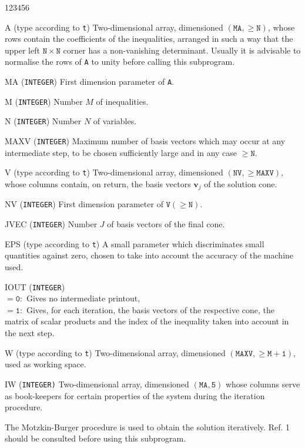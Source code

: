 \begin{DLtt}{123456}
\item [A] (type according to {\tt t}) Two-dimensional array, dimensioned
$\mathtt{ (MA,\ge N)}$, whose rows contain the  coefficients of the
inequalities, arranged in such a way that the upper left
$\mathtt{N \times N}$ corner has a non-vanishing determinant.
Usually it is advisable to normalise the rows of {\tt A} to unity
before calling this subprogram.
\item [MA] ({\tt INTEGER}) First dimension parameter of {\tt A}.
\item [M] ({\tt INTEGER}) Number $M$ of inequalities.
\item [N] ({\tt INTEGER}) Number $N$ of variables.
\item [MAXV] ({\tt INTEGER}) Maximum number of basis vectors
which may occur at any intermediate step, to be chosen
sufficiently large and in any case $\mathtt{\ge N}$.
\item [V] (type according to {\tt t}) Two-dimensional array, dimensioned
$\mathtt{(NV,\ge MAXV)}$,  whose columns contain, on
return, the basis vectors $\mathbf{v}_j$ of the solution cone.
\item[NV] ({\tt INTEGER}) First dimension parameter of
$\mathtt{V (\ge N)}$.
\item [JVEC] ({\tt INTEGER}) Number $J$ of basis vectors of the final
cone.
\item [EPS] (type according to {\tt t}) A small parameter which
discriminates small quantities against zero, chosen to take into
account the accuracy of the machine used.
\item [IOUT] ({\tt INTEGER}) \\
$\mathtt{= 0:}$ Gives no intermediate printout, \\
$\mathtt{= 1:}$ Gives, for each iteration, the basis vectors of the
respective cone, the matrix of scalar products and the index of the
inequality taken into account in the next step.
\item [W] (type according to {\tt t}) Two-dimensional array, dimensioned
$(\mathtt{MAXV,\ge M+1})$, used as working space.
\item [IW]({\tt INTEGER)} Two-dimensional array, dimensioned
$\mathtt{(MA,5)}$ whose columns serve as book-keepers
for certain properties of the system during the iteration procedure.
\end{DLtt}
\Method
The Motzkin-Burger procedure is used to obtain the solution iteratively.
Ref. 1 should be consulted before using this subprogram.
\Restrict
